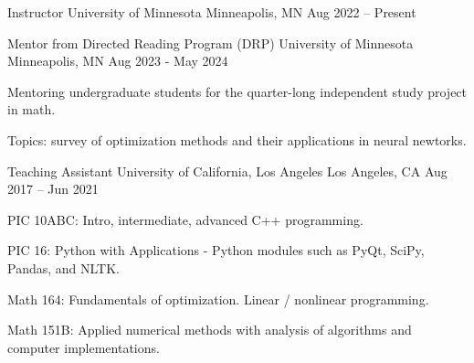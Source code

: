 

\begin{cventries}

  \cventry
    {Instructor} %
    {University of Minnesota} %
    {Minneapolis, MN} %
    {Aug 2022 – Present} %
    {
      \begin{cvteachings}
      \end{cvteachings}
    }
    \cventry
    {Mentor from Directed Reading Program (DRP)} %
    {University of Minnesota} %
    {Minneapolis, MN} %
    {Aug 2023 - May 2024} %
    {
      \begin{cvitems} %
        \item Mentoring undergraduate students for the quarter-long independent study project in math.
        \item Topics: survey of optimization methods and their applications in neural newtorks.
      \end{cvitems}
    }


  \cventry
    {Teaching Assistant} %
    {University of California, Los Angeles} %
    {Los Angeles, CA} %
    {Aug 2017 – Jun 2021} %
    {
      \begin{cvitems} %
        \item {PIC 10ABC: Intro, intermediate, advanced C++ programming.}
        \item {PIC 16: Python with Applications} - Python modules such as PyQt, SciPy, Pandas, and NLTK.
        \item {Math 164: Fundamentals of optimization. Linear / nonlinear programming}.
        \item {Math 151B: Applied numerical methods with analysis of algorithms and computer implementations}.
      \end{cvitems}
    }


\end{cventries}
